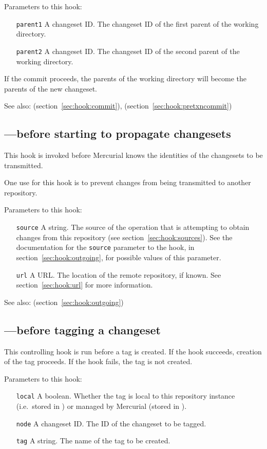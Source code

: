 Parameters to this hook:
\begin{itemize}
\item[\texttt{parent1}] A changeset ID.  The changeset ID of the first
  parent of the working directory.
\item[\texttt{parent2}] A changeset ID.  The changeset ID of the second
  parent of the working directory.
\end{itemize}
If the commit proceeds, the parents of the working directory will
become the parents of the new changeset.

See also:  (section~\ref{sec:hook:commit}),
 (section~\ref{sec:hook:pretxncommit})

\subsection{---before starting to propagate changesets}
\label{sec:hook:preoutgoing}

This hook is invoked before Mercurial knows the identities of the
changesets to be transmitted.

One use for this hook is to prevent changes from being transmitted to
another repository.

Parameters to this hook:
\begin{itemize}
\item[\texttt{source}] A string.  The source of the operation that is
  attempting to obtain changes from this repository (see
  section~\ref{sec:hook:sources}).  See the documentation for the
  \texttt{source} parameter to the  hook, in
  section~\ref{sec:hook:outgoing}, for possible values of this
  parameter.
\item[\texttt{url}] A URL.  The location of the remote repository, if
  known.  See section~\ref{sec:hook:url} for more information.
\end{itemize}

See also:  (section~\ref{sec:hook:outgoing})

\subsection{---before tagging a changeset}
\label{sec:hook:pretag}

This controlling hook is run before a tag is created.  If the hook
succeeds, creation of the tag proceeds.  If the hook fails, the tag is
not created.

Parameters to this hook:
\begin{itemize}
\item[\texttt{local}] A boolean.  Whether the tag is local to this
  repository instance (i.e.~stored in ) or
  managed by Mercurial (stored in ).
\item[\texttt{node}] A changeset ID.  The ID of the changeset to be tagged.
\item[\texttt{tag}] A string.  The name of the tag to be created.
\end{itemize}

